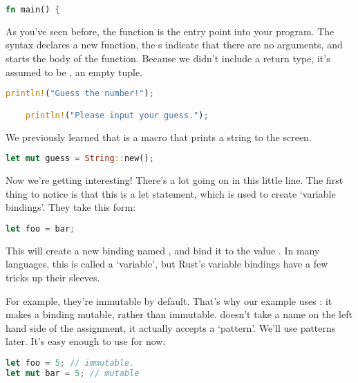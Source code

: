 \begin{lstlisting}[language=Rust]
fn main() {
\end{lstlisting}

As you’ve seen before, the  function is the entry point into your program. The  syntax declares a new 
function, the \code{()}s indicate that there are no arguments, and \code{\{} starts the body of the function. Because we 
didn’t include a return type, it’s assumed to be \code{()}, an empty tuple.

\begin{lstlisting}[language=Rust]
    println!("Guess the number!");

    println!("Please input your guess.");
\end{lstlisting}

We previously learned that  is a macro that prints a string to the screen.

\begin{lstlisting}[language=Rust]
    let mut guess = String::new();
\end{lstlisting}

Now we’re getting interesting! There’s a lot going on in this little line. The first thing to notice is that this is a 
let statement, which is used to create ‘variable bindings’. They take this form:

\begin{lstlisting}[language=Rust]
let foo = bar;
\end{lstlisting}

This will create a new binding named , and bind it to the value . In many languages, this is called a 
‘variable’, but Rust’s variable bindings have a few tricks up their sleeves.

\blank

For example, they’re immutable by default. That’s why our example uses : it makes a binding mutable, rather than 
immutable.  doesn’t take a name on the left hand side of the assignment, it actually accepts a ‘pattern’. We’ll 
use patterns later. It’s easy enough to use for now:

\begin{lstlisting}[language=Rust]
let foo = 5; // immutable.
let mut bar = 5; // mutable
\end{lstlisting}

